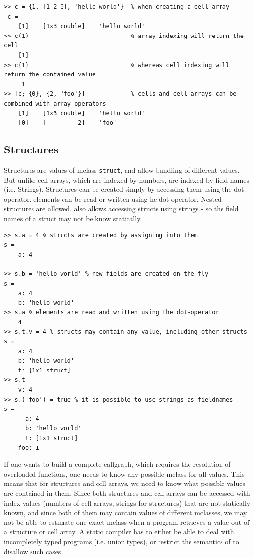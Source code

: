 \begin{lstlisting}
>> c = {1, [1 2 3], 'hello world'}  % when creating a cell array
 c = 
    [1]    [1x3 double]    'hello world'
>> c(1)                             % array indexing will return the cell
    [1]
>> c{1}                             % whereas cell indexing will return the contained value
     1
>> [c; {0}, {2, 'foo'}]             % cells and cell arrays can be combined with array operators
    [1]    [1x3 double]    'hello world'
    [0]    [         2]    'foo'        
\end{lstlisting}

\subsection{Structures}
\label{sec:struct}

Structures are \matlab values of mclass {\tt struct}, and allow bundling of different
\matlab values. But unlike cell arrays, which are indexed by numbers,  are indexed
by field names (i.e. Strings). Structures can be created simply by
accessing them using the dot-operator. elements can be read or written
using he dot-operator. Nested structures are allowed. \matlab also allows accessing
structs using strings - so the field names of a struct may not be know statically.

\begin{lstlisting}
>> s.a = 4 % structs are created by assigning into them
s = 
    a: 4

>> s.b = 'hello world' % new fields are created on the fly
s = 
    a: 4
    b: 'hello world'
>> s.a % elements are read and written using the dot-operator
    4
>> s.t.v = 4 % structs may contain any value, including other structs
s = 
    a: 4
    b: 'hello world'
    t: [1x1 struct]
>> s.t 
    v: 4
>> s.('foo') = true % it is possible to use strings as fieldnames
s = 
      a: 4
      b: 'hello world'
      t: [1x1 struct]
    foo: 1
\end{lstlisting}

If one wants to build a complete callgraph, which requires the
resolution of overloaded functions, one needs to know any possible
mclass for all values. This means that for structures and cell arrays,
we need to know what possible values are contained in them. Since both
structures and cell arrays can be accessed with index-values (numbers
of cell arrays, strings for structures) that are not statically known, and since both of
them may contain values of different mclasses, we may not be able to
estimate one exact mclass when a program retrieves a value out of a
structure or cell array. A static compiler has to either be able to
deal with incompletely typed programs (i.e. union types), or restrict
the semantics of \matlab to disallow such cases.


